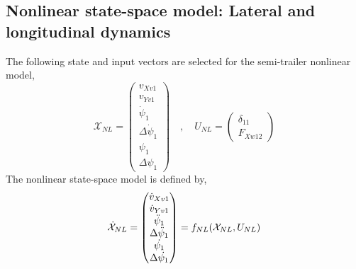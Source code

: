 \documentclass[12pt]{article}
\begin{document}
\subsection{Nonlinear state-space model: Lateral and longitudinal dynamics}
The following state and input vectors are selected for the semi-trailer nonlinear model,
\begin{equation}\label{NL_states_input}
    \mathcal{X}_{NL} = \begin{pmatrix} v_{Xv1} \\ v_{Yv1} \\ \Dot{\psi}_1 \\ \Delta \dot{\psi}_1 \\ \psi_1 \\ \Delta \psi_1 \end{pmatrix} \quad , \quad U_{NL} = \begin{pmatrix} \delta_{11} \\ F_{Xw12} \end{pmatrix}
\end{equation}
The nonlinear state-space model is defined by,
\begin{equation} \label{Nonlinear_state_space_eq}
    \Dot{\mathcal{X}}_{NL} = \begin{pmatrix} \Dot{v}_{Xv1}  \\ \Dot{v}_{Yv1} \\ \Ddot{\psi}_1 \\ \Delta \Ddot{\psi}_1 \\ \Dot{\psi_1} \\ \Delta \Dot{\psi_1} \end{pmatrix} = f_{NL}(\mathcal{X}_{NL},U_{NL})
\end{equation}
\end{document}
